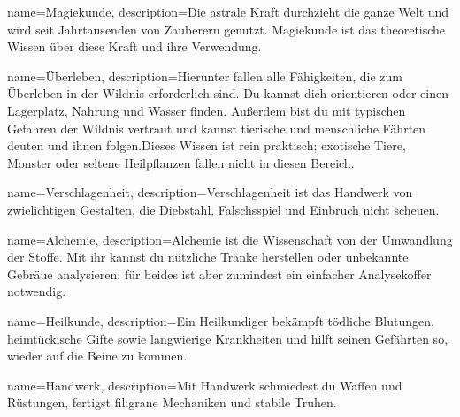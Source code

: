 {
    name={Magiekunde},
    description={Die astrale Kraft durchzieht die ganze Welt und wird seit Jahrtausenden von Zauberern genutzt. Magiekunde ist das theoretische Wissen über diese Kraft und ihre Verwendung.}
}


{
    name={Überleben},
    description={Hierunter fallen alle Fähigkeiten, die zum Überleben in der Wildnis erforderlich sind. Du kannst dich orientieren oder einen Lagerplatz, Nahrung und Wasser finden. Außerdem bist du mit typischen Gefahren der Wildnis vertraut und kannst tierische und menschliche Fährten deuten und ihnen folgen.\newline Dieses Wissen ist rein praktisch; exotische Tiere, Monster oder seltene Heilpflanzen fallen nicht in diesen Bereich.}
}


{
    name={Verschlagenheit},
    description={Verschlagenheit ist das Handwerk von zwielichtigen Gestalten, die Diebstahl, Falschsspiel und Einbruch nicht scheuen.}
}


{
    name={Alchemie},
    description={Alchemie ist die Wissenschaft von der Umwandlung der Stoffe. Mit ihr kannst du nützliche Tränke herstellen oder unbekannte Gebräue analysieren; für beides ist aber zumindest ein einfacher Analysekoffer notwendig.}
}


{
    name={Heilkunde},
    description={Ein Heilkundiger bekämpft tödliche Blutungen, heimtückische Gifte sowie langwierige Krankheiten und hilft seinen Gefährten so, wieder auf die Beine zu kommen. }
}


{
    name={Handwerk},
    description={Mit Handwerk schmiedest du Waffen und Rüstungen, fertigst filigrane Mechaniken und stabile Truhen.}
}


